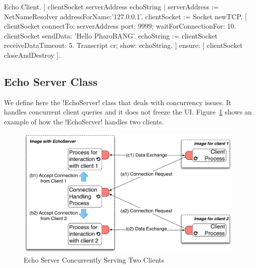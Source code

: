 \documentclass[a4paper,10pt,twoside]{book}
\begin{document}
\begin{script}[echoClient]{Echo Client.}
| clientSocket serverAddress echoString |
serverAddress := NetNameResolver addressForName:'127.0.0.1'.
clientSocket := Socket newTCP.
[ clientSocket 
	connectTo: serverAddress port: 9999;
	waitForConnectionFor: 10.
 clientSocket sendData: 'Hello PharoBANG'.
 echoString  := clientSocket receiveDataTimeout: 5.
 Transcript cr; show: echoString.
] ensure: [ clientSocket closeAndDestroy ].
\end{script}
%

\subsection{Echo Server Class}\label{sec:echoServerClass}
We define here the \ct!EchoServer! class that deals with concurrency issues.
It handles concurrent client queries and it does not freeze the UI.
Figure~\ref{fig:echoServerConcurrency} shows an example of how the \ct!EchoServer! handles two clients. 

\begin{figure}[ht]\centering
	\includegraphics[width=.75\linewidth]{echoServerConcurrency}
	\caption{Echo Server Concurrently Serving Two Clients}
	\label{fig:echoServerConcurrency}
\end{figure}
\end{document}
